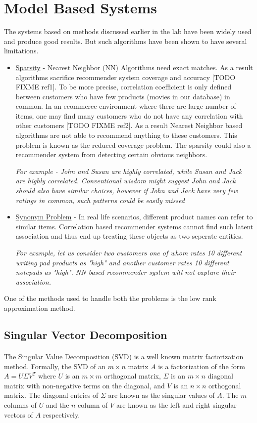 \documentclass{article}
\begin{document}
  \section{Model Based Systems}
  The systems based on methods discussed earlier in the lab have been widely used and produce good results. But such algorithms have been shown to have several limitations. 
  \begin{itemize}
    \item \underline{Sparsity} - Nearest Neighbor (NN) Algorithms need exact matches. As a result algorithms sacrifice recommender system coverage and accuracy [TODO FIXME ref1]. To be more precise, correlation coefficient is only defined between customers who have few products (movies in our database) in common. In an ecommerce environment where there are large number of items, one may find many customers who do not have any correlation with other customers [TODO FIXME ref2]. As a result Nearest Neighbor based algorithms are not able to recommend anything to these customers. This problem is known as the reduced coverage problem. The sparsity could also a recommender system from detecting certain obvious neighbors. 

\textit{For example - John and Susan are highly correlated, while Susan and Jack are highly correlated. Conventional wisdom might suggest John and Jack should also have similar choices, however if John and Jack have very few ratings in common, such patterns could be easily missed}
    \item \underline{Synonym Problem} - In real life scenarios, different product names can refer to similar items. Correlation based recommender systems cannot find such latent association and thus end up treating these objects as two seperate entities. 

\textit{For example, let us consider two customers one of whom rates 10 different writing pad products as "high" and another customer rates 10 different notepads as "high". NN based recommender system will not capture their association.}
  \end{itemize}
  One of the methods used to handle both the problems is the low rank approximation method.
  \subsection{Singular Vector Decomposition}
\paragraph{}
The Singular Value Decomposition (SVD) is a well known matrix factorization method. Formally, the SVD of an $m \times n$ matrix $A$ is a factorization of the form $A = U \Sigma V^{T}$ where $U$ is an $m \times m$ orthogonal matrix, $\Sigma$ is an $m \times n$ diagonal matrix with non-negative terms on the diagonal, and $V$ is an $n \times n$ orthogonal matrix. The diagonal entries of $\Sigma$ are known as the singular values of $A$. The $m$ columns of $U$ and the $n$ column of $V$ are known as the left and right singular vectors of $A$ respectively.
\end{document}

